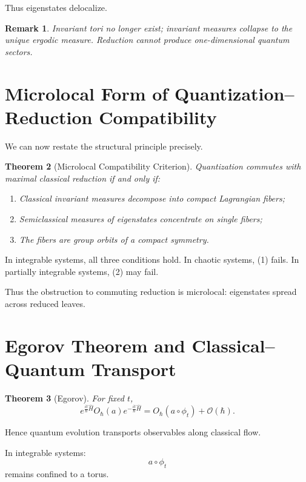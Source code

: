 \documentclass[11pt]{article}
\newtheorem{theorem}{Theorem}[section]
\newtheorem{remark}[theorem]{Remark}
\begin{document}
Thus eigenstates delocalize.

\begin{remark}
Invariant tori no longer exist;
invariant measures collapse to the unique ergodic measure.
Reduction cannot produce one-dimensional quantum sectors.
\end{remark}

\section{Microlocal Form of Quantization–Reduction Compatibility}

We can now restate the structural principle precisely.

\begin{theorem}[Microlocal Compatibility Criterion]
Quantization commutes with maximal classical reduction
if and only if:

\begin{enumerate}
\item Classical invariant measures decompose into compact
Lagrangian fibers;
\item Semiclassical measures of eigenstates concentrate on
single fibers;
\item The fibers are group orbits of a compact symmetry.
\end{enumerate}
\end{theorem}

In integrable systems, all three conditions hold.
In chaotic systems, (1) fails.
In partially integrable systems, (2) may fail.

Thus the obstruction to commuting reduction is microlocal:
eigenstates spread across reduced leaves.

\section{Egorov Theorem and Classical–Quantum Transport}

\begin{theorem}[Egorov]
For fixed $t$,
\[
e^{\frac{i t}{\hbar}\hat H}
O_\hbar(a)
e^{-\frac{i t}{\hbar}\hat H}
=
O_\hbar(a \circ \phi_t)
+
\mathcal{O}(\hbar).
\]
\end{theorem}

Hence quantum evolution transports observables along classical flow.

In integrable systems:
\[
a \circ \phi_t
\]
remains confined to a torus.
\end{document}
